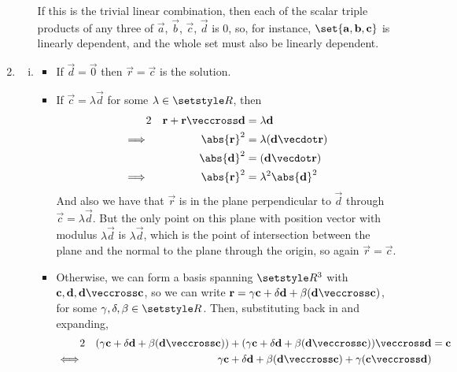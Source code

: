 \documentclass[fleqn,a4paper,11pt]{article}
\begin{document}
\begin{enumerate}
\begin{enumerate}
      If this is the trivial linear combination, then each of the scalar triple
      products of any three of \(\vec a\), \(\vec b\), \(\vec c\), \(\vec d\) is
      0, so, for instance, \(\set{\vec a, \vec b, \vec c}\) is linearly
      dependent, and the whole set must also be linearly dependent.
    \end{enumerate}
   \item
    \begin{enumerate}[(i)]
     \item
      \begin{itemize}
       \item
        If \(\vec d = \vec 0\) then \(\vec r = \vec c\) is the solution.
       \item
        If \(\vec c = \lambda \vec d\) for some \(\lambda \in \Reals\), then
        \begin{alignat*}2
         && \vec r + \vec r \veccross \vec d &= \lambda \vec d \\
         \implies{}&& \abs{\vec r}^2 &= \lambda(\vec d \vecdot \vec r) \\
         && \abs{\vec d}^2 &= (\vec d \vecdot \vec r) \\
         \implies{}&& \abs{\vec r}^2 &= \lambda^2\abs{\vec d}^2
        \end{alignat*}
        And also we have that \(\vec r\) is in the plane perpendicular to
        \(\vec d\) through \(\vec c = \lambda \vec d\). But the only point on
        this plane with position vector with modulus \(\lambda \vec d\) is
        \(\lambda \vec d\), which is the point of intersection between the plane
        and the normal to the plane through the origin, so again
        \(\vec r = \vec c\).
       \item
        Otherwise, we can form a basis spanning \(\Reals^3\) with
        \({\vec c, \vec d, \vec d \veccross \vec c}\), so we can write
        \(\vec r = \gamma \vec c + \delta \vec d
                   + \beta(\vec d \veccross \vec c)\), for some
        \(\gamma, \delta, \beta \in \Reals\).
        Then, substituting back in and expanding,
        \begin{alignat*}2
         && (\gamma \vec c + \delta \vec d
             + \beta(\vec d \veccross \vec c)) +
            (\gamma \vec c + \delta \vec d
             + \beta(\vec d \veccross \vec c)) \veccross \vec d
             &= \vec c \\
         \iff{}&&
         \gamma \vec c + \delta \vec d + \beta (\vec d \veccross \vec c)
          + \gamma (\vec c \veccross \vec d)

\end{alignat*}
\end{itemize}
\end{enumerate}
\end{enumerate}
\end{document}

